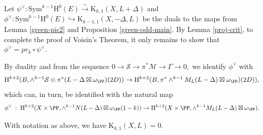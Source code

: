 Let $\psi^{\vee}: \mathrm{Sym}^{k-1}\mathrm{H}^0(E) \xrightarrow{\sim} \mathrm{K}_{k,1}(X,L+\Delta)$ and $\phi^{\vee}: \mathrm{Sym}^{k-1}\mathrm{H}^0(E) \hookrightarrow \mathrm{K}_{k-1,1}(X,-\Delta, L)$ be the duals to the maps from Lemma \ref{green-pic2} and Proposition \ref{green-odd-main}. By Lemma \ref{proj-crit}, to complete the proof of Voisin's Theorem, it only remains to show that $\phi^{\vee}=pr_k \circ \psi^{\vee}$.

By duality and from the sequence $0 \to \mathcal{S} \to \pi^* \mathcal{M} \to \Gamma \to 0,$ we identify $\phi^{\vee}$ with
$$\mathrm{H}^{k+2}(B, \wedge^{k-1} \mathcal{S}\otimes \pi^*(L-\Delta \boxtimes \omega_{\PP})(2D)) \to \mathrm{H}^{k+2}(B, \pi^*\wedge^{k-1}M_L(L-\Delta) \boxtimes \omega_{\PP})(2D)),$$
which can, in turn, be identified with the natural map
$$\phi^{\vee} \; : \; \mathrm{H}^{k+2}(X \times \PP, \wedge^{k-1}N (L-\Delta) \boxtimes \omega_{\PP}(1-k)) \to \mathrm{H}^{k+2}(X \times \PP, \wedge^{k-1}M_L(L-\Delta) \boxtimes \omega_{\PP}).$$
\begin{thm}
\notready
With notation as above, we have $\mathrm{K}_{k,1}(X,L)=0$.
\end{thm}
